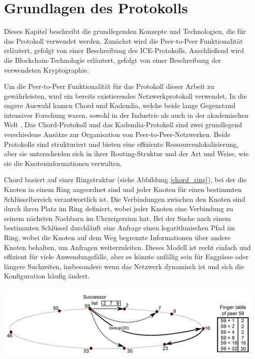 \section{Grundlagen des Protokolls}
\label{sec:grundlagen_des_protokolls}

Dieses Kapitel beschreibt die grundlegenden Konzepte und Technologien, die für das Protokoll verwendet werden. Zunächst wird die Peer-to-Peer Funktionalität erläutert, gefolgt von einer Beschreibung des ICE-Protokolls. Anschließend wird die Blockchain-Technologie erläutert, gefolgt von einer Beschreibung der verwendeten Kryptographie.


Um die Peer-to-Peer Funktionalität für das Protokoll dieser Arbeit zu gewährleisten, wird ein bereits existierendes Netzwerkprotokoll verwendet. In die engere Auswahl kamen Chord und Kademlia, welche beide lange Gegenstand intensiver Forschung waren, sowohl in der Industrie als auch in der akademischen Welt \parencite[S. 808]{MedranoChavez_ChordKademliaHighChurnScenarios}. 
Das Chord-Protokoll und das Kademlia-Protokoll sind zwei grundlegend verschiedene Ansätze zur Organisation von Peer-to-Peer-Netzwerken. Beide Protokolle sind strukturiert und bieten eine effiziente Ressourcenlokalisierung, aber sie unterscheiden sich in ihrer Routing-Struktur und der Art und Weise, wie sie die Knoteninformationen verwalten.

Chord basiert auf einer Ringstruktur (siehe Abbildung \ref{chord_ring}), bei der die Knoten in einem Ring angeordnet sind und jeder Knoten für einen bestimmten Schlüsselbereich verantwortlich ist. Die Verbindungen zwischen den Knoten sind durch ihren Platz im Ring definiert, wobei jeder Knoten eine Verbindung zu seinem nächsten Nachbarn im Uhrzeigersinn hat. Bei der Suche nach einem bestimmten Schlüssel durchläuft eine Anfrage einen logarithmischen Pfad im Ring, wobei die Knoten auf dem Weg begrenzte Informationen über andere Knoten behalten, um Anfragen weiterzuleiten. Dieses Modell ist recht einfach und effizient für viele Anwendungsfälle, aber es könnte anfällig sein für Engpässe oder längere Suchzeiten, insbesondere wenn das Netzwerk dynamisch ist und sich die Konfiguration häufig ändert.

\begin{center}
    \captionsetup{type=figure}
    \includegraphics[width=0.9\linewidth]{images/chord_ring.png}
    \label{chord_ring}
\end{center}


